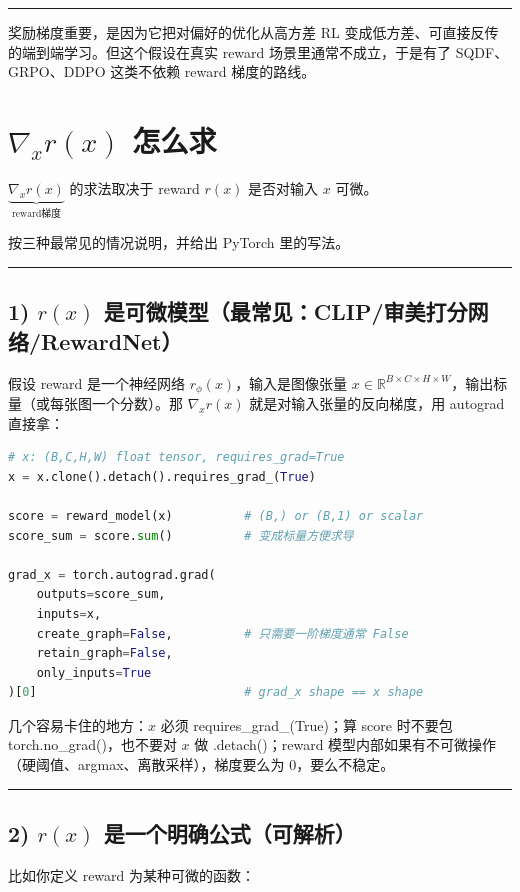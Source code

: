 \hrule

奖励梯度重要，是因为它把对偏好的优化从高方差 RL 变成低方差、可直接反传的端到端学习。但这个假设在真实 reward 场景里通常不成立，于是有了 SQDF、GRPO、DDPO 这类不依赖 reward 梯度的路线。

\section{\(\nabla_x r(x)\) 怎么求}

\(\underbrace{\nabla_x r(x)}_{\text{reward梯度}}\) 的求法取决于 reward \(r(x)\) 是否对输入 \(x\) 可微。

按三种最常见的情况说明，并给出 PyTorch 里的写法。

\hrule

\subsection{1) \(r(x)\) 是可微模型（最常见：CLIP/审美打分网络/RewardNet）}

假设 reward 是一个神经网络 \(r_\phi(x)\)，输入是图像张量 \(x\in\mathbb{R}^{B\times C\times H\times W}\)，输出标量（或每张图一个分数）。那 \(\nabla_x r(x)\) 就是对输入张量的反向梯度，用 autograd 直接拿：

\begin{lstlisting}[language=python]
# x: (B,C,H,W) float tensor, requires_grad=True
x = x.clone().detach().requires_grad_(True)

score = reward_model(x)          # (B,) or (B,1) or scalar
score_sum = score.sum()          # 变成标量方便求导

grad_x = torch.autograd.grad(
    outputs=score_sum,
    inputs=x,
    create_graph=False,          # 只需要一阶梯度通常 False
    retain_graph=False,
    only_inputs=True
)[0]                             # grad_x shape == x shape
\end{lstlisting}

几个容易卡住的地方：\(x\) 必须 requires\_grad\_(True)；算 score 时不要包 torch.no\_grad()，也不要对 \(x\) 做 .detach()；reward 模型内部如果有不可微操作（硬阈值、argmax、离散采样），梯度要么为 0，要么不稳定。

\hrule

\subsection{2) \(r(x)\) 是一个明确公式（可解析）}

比如你定义 reward 为某种可微的函数：

